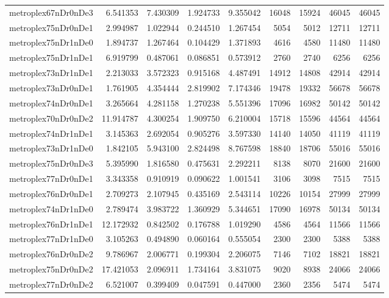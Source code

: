 \begin{longtable}{|l|r|r|r|r|r|r|r|r|}
metroplex67nDr0nDe3 & 6.541353 & 7.430309 & 1.924733 & 9.355042 & 16048 & 15924 & 46045 & 46045 \\
metroplex75nDr0nDe1 & 2.994987 & 1.022944 & 0.244510 & 1.267454 & 5054 & 5012 & 12711 & 12711 \\
metroplex75nDr1nDe0 & 1.894737 & 1.267464 & 0.104429 & 1.371893 & 4616 & 4580 & 11480 & 11480 \\
metroplex75nDr1nDe1 & 6.919799 & 0.487061 & 0.086851 & 0.573912 & 2760 & 2740 & 6256 & 6256 \\
metroplex73nDr1nDe1 & 2.213033 & 3.572323 & 0.915168 & 4.487491 & 14912 & 14808 & 42914 & 42914 \\
metroplex73nDr0nDe1 & 1.761905 & 4.354444 & 2.819902 & 7.174346 & 19478 & 19332 & 56678 & 56678 \\
metroplex74nDr0nDe1 & 3.265664 & 4.281158 & 1.270238 & 5.551396 & 17096 & 16982 & 50142 & 50142 \\
metroplex70nDr0nDe2 & 11.914787 & 4.300254 & 1.909750 & 6.210004 & 15718 & 15596 & 44564 & 44564 \\
metroplex74nDr1nDe1 & 3.145363 & 2.692054 & 0.905276 & 3.597330 & 14140 & 14050 & 41119 & 41119 \\
metroplex73nDr1nDe0 & 1.842105 & 5.943100 & 2.824498 & 8.767598 & 18840 & 18706 & 55016 & 55016 \\
metroplex75nDr0nDe3 & 5.395990 & 1.816580 & 0.475631 & 2.292211 & 8138 & 8070 & 21600 & 21600 \\
metroplex77nDr0nDe1 & 3.343358 & 0.910919 & 0.090622 & 1.001541 & 3106 & 3098 & 7515 & 7515 \\
metroplex76nDr0nDe1 & 2.709273 & 2.107945 & 0.435169 & 2.543114 & 10226 & 10154 & 27999 & 27999 \\
metroplex74nDr1nDe0 & 2.789474 & 3.983722 & 1.360929 & 5.344651 & 17090 & 16978 & 50134 & 50134 \\
metroplex76nDr1nDe1 & 12.172932 & 0.842502 & 0.176788 & 1.019290 & 4586 & 4564 & 11566 & 11566 \\
metroplex77nDr1nDe0 & 3.105263 & 0.494890 & 0.060164 & 0.555054 & 2300 & 2300 & 5388 & 5388 \\
metroplex76nDr0nDe2 & 9.786967 & 2.006771 & 0.199304 & 2.206075 & 7146 & 7102 & 18821 & 18821 \\
metroplex75nDr0nDe2 & 17.421053 & 2.096911 & 1.734164 & 3.831075 & 9020 & 8938 & 24066 & 24066 \\
metroplex77nDr0nDe2 & 6.521007 & 0.399409 & 0.047591 & 0.447000 & 2360 & 2356 & 5474 & 5474 \\

\end{longtable}
